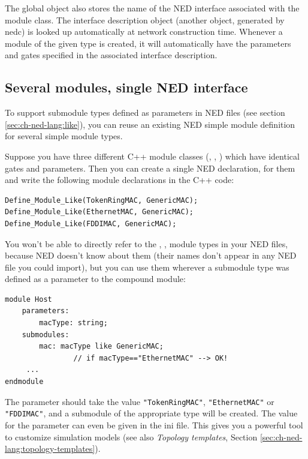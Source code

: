 The global object also stores the name of the NED
interface associated with the module class. The
interface description object
(another object, generated by nedc) is looked up automatically at
network construction time. Whenever a module of the given type is
created, it will automatically have the parameters and gates specified
in the associated interface description.



\subsection{Several modules, single NED interface}

To support submodule types defined as parameters in
NED files (see section \ref{sec:ch-ned-lang:like}),
you can reuse an existing NED simple module definition
for several simple module types.

Suppose you have three different C++ module classes (,
, ) which have identical gates and parameters.
Then you can create a single NED declaration,  for them
and write the following module declarations in the C++ code:

\begin{verbatim}
Define_Module_Like(TokenRingMAC, GenericMAC);
Define_Module_Like(EthernetMAC, GenericMAC);
Define_Module_Like(FDDIMAC, GenericMAC);
\end{verbatim}

You won't be able to directly refer to the ,
,  module types in your NED files,
because NED doesn't know about them (their names don't appear
in any NED file you could import), but you can use them wherever
a submodule type was defined as a parameter to the compound module:

\begin{verbatim}
module Host
    parameters:
        macType: string;
    submodules:
        mac: macType like GenericMAC;
                // if macType=="EthernetMAC" --> OK!
     ...
endmodule
\end{verbatim}

\begin{sloppypar}
The  parameter should take the value \texttt{"TokenRingMAC"},
\texttt{"EthernetMAC"} or \texttt{"FDDIMAC"}, and a submodule of the appropriate
type will be created. The value for the parameter can even be given in
the ini file. This gives you a powerful tool to customize simulation
models (see also \textit{Topology templates}, Section
\ref{sec:ch-ned-lang:topology-templates}).
\end{sloppypar}




